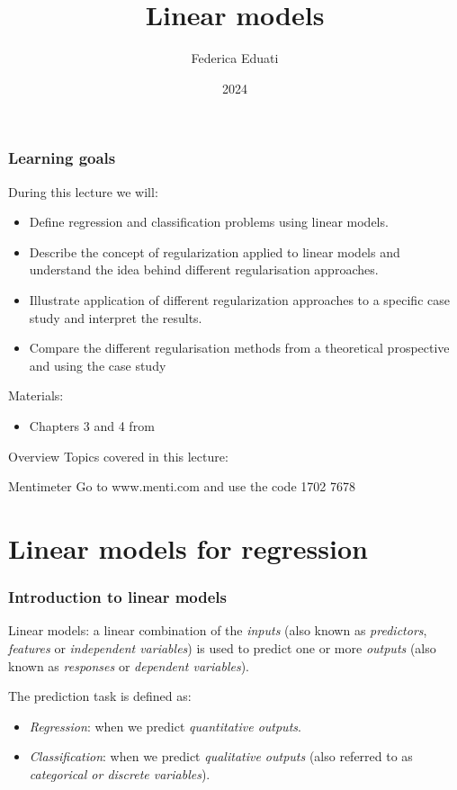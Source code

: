 \documentclass[notes]{beamer}          %
\title{Linear models}
\author{Federica Eduati}
\institute{Eindhoven University of Technology

Department of Biomedical Engineering}
\date{2024}
\begin{document}
 
\frame{\titlepage}
 
\begin{frame}
\frametitle{Learning goals}

During this lecture we will:
\begin{itemize}
	\item Define regression and classification problems using linear models.   
    \item Describe the concept of regularization applied to linear models and understand the idea behind different regularisation approaches. 
    \item Illustrate application of different regularization approaches to a specific case study and interpret the results.
    \item Compare the different regularisation methods from a theoretical prospective and using the case study
\end{itemize}

\vspace{5mm} 

Materials: 
\begin{itemize}
    \item Chapters 3 and 4 from \cite{elements}
\end{itemize}

\end{frame}


\begin{frame}{Overview}
Topics covered in this lecture:
    \tableofcontents
\end{frame}

\begin{frame}{Mentimeter}
Go to www.menti.com and use the code 1702 7678
\end{frame}



\section{Linear models for regression}


\begin{frame}
\frametitle{Introduction to linear models}
Linear models: a linear combination of the \textit{inputs} (also known as \textit{predictors}, \textit{features} or \textit{independent variables}) is used to predict one or more \textit{outputs} (also known as \textit{responses} or \textit{dependent variables}).

\vspace{5mm} 

The prediction task is defined as:
\begin{itemize}
    \item \textit{Regression}: when we predict \textit{quantitative outputs}.
    \item \textit{Classification}: when we predict \textit{qualitative outputs} (also referred to as \textit{categorical or discrete variables}).
\end{itemize}

\end{frame}
\end{document}
